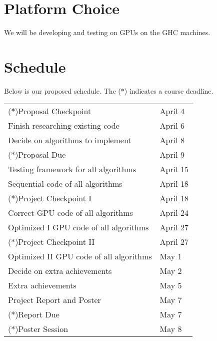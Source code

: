 \documentclass[12pt]{article}
\begin{document}
\section{Platform Choice}
We will be developing and testing on GPUs on the GHC machines.

\section{Schedule}
Below is our proposed schedule. The ($*$) indicates a course deadline.
\begin{center}
	\begin{tabular}{l l}
		($*$)Proposal Checkpoint & April 4 \\
		Finish researching existing code & April 6 \\
		Decide on algorithms to implement & April 8 \\
		($*$)Proposal Due & April 9 \\
		Testing framework for all algorithms & April 15 \\
		Sequential code of all algorithms & April 18 \\
		($*$)Project Checkpoint I & April 18 \\
		Correct GPU code of all algorithms & April 24 \\
		Optimized I GPU code of all algorithms & April 27 \\
		($*$)Project Checkpoint II & April 27 \\
		Optimized II GPU code of all algorithms & May 1 \\
		Decide on extra achievements & May 2 \\
		Extra achievements & May 5 \\
		Project Report and Poster & May 7 \\
		($*$)Report Due & May 7 \\
		($*$)Poster Session & May 8
	\end{tabular}
\end{center}



\end{document}
